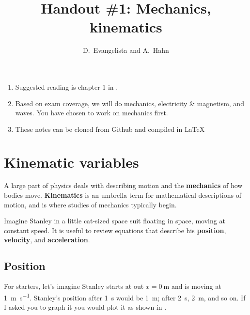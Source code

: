 \documentclass{tufte-handout}
\title{Handout \#1: Mechanics, kinematics}
\author{D.~Evangelista and A.~Hahn}
\date{\printdate{6/14/2021}}
\begin{document}
\maketitle
\begin{enumerate}
\item Suggested reading is chapter 1 in \citeauthor{kleppner2014introduction}\cite{kleppner2014introduction}. 
\item Based on exam coverage, we will do mechanics, electricity \& magnetism, and waves. You have chosen to work on mechanics first.
\item These notes can be cloned from Github and compiled in \LaTeX{}
\end{enumerate}

\section{Kinematic variables}
A large part of physics deals with describing motion and the \textbf{mechanics} of how bodies move. \textbf{Kinematics} is an umbrella term for mathematical descriptions of motion, and is where studies of mechanics typically begin. 

Imagine Stanley in a little cat-sized space suit floating in space, moving at constant speed. It is useful to review equations that describe his \textbf{position}, \textbf{velocity}, and \textbf{acceleration}. 

\subsection{Position}
For starters, let's imagine Stanley starts at out $x=\SI{0}{\meter}$ and is moving at \SI{1}{\meter\per\second}. Stanley's position after \SI{1}{\second} would be \SI{1}{\meter}; after \SI{2}{\second}, \SI{2}{\meter}, and so on. If I asked you to graph it you would plot it as shown in .
\begin{marginfigure}
\caption{Stanley's position}
\label{fig:position}
\end{marginfigure}
\end{document}
